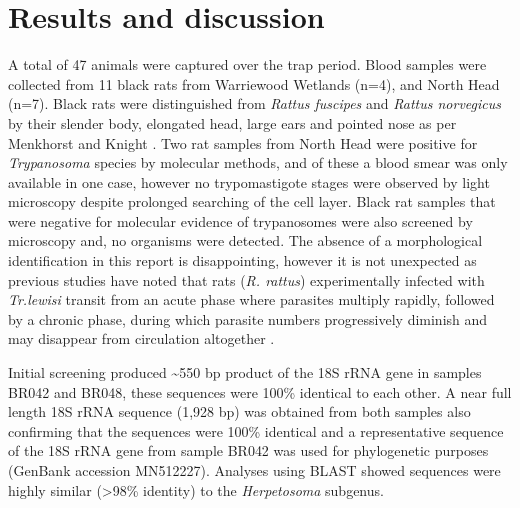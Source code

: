 \documentclass[a4paper, nobind]{templates/ociamthesis}
\begin{document}
\hypertarget{results-and-discussion-1}{%
\section{Results and discussion}\label{results-and-discussion-1}}

A total of 47 animals were captured over the trap period. Blood samples were collected from 11 black rats from Warriewood Wetlands (n=4), and North Head (n=7). Black rats were distinguished from \emph{Rattus fuscipes} and \emph{Rattus norvegicus} by their slender body, elongated head, large ears and pointed nose as per Menkhorst and Knight \autocite*{menkhorstFieldGuideMammals2011}. Two rat samples from North Head were positive for \emph{Trypanosoma} species by molecular methods, and of these a blood smear was only available in one case, however no trypomastigote stages were observed by light microscopy despite prolonged searching of the cell layer. Black rat samples that were negative for molecular evidence of trypanosomes were also screened by microscopy and, no organisms were detected. The absence of a morphological identification in this report is disappointing, however it is not unexpected as previous studies have noted that rats (\emph{R. rattus}) experimentally infected with \emph{Tr.lewisi} transit from an acute phase where parasites multiply rapidly, followed by a chronic phase, during which parasite numbers progressively diminish and may disappear from circulation altogether \autocite{mackerrasHaematozoaAustralianMammals1959}.

Initial screening produced \textasciitilde550 bp product of the 18S rRNA gene in samples BR042 and BR048, these sequences were 100\% identical to each other. A near full length 18S rRNA sequence (1,928 bp) was obtained from both samples also confirming that the sequences were 100\% identical and a representative sequence of the 18S rRNA gene from sample BR042 was used for phylogenetic purposes (GenBank accession MN512227). Analyses using BLAST showed sequences were highly similar (\textgreater98\% identity) to the \emph{Herpetosoma} subgenus.
\end{document}
